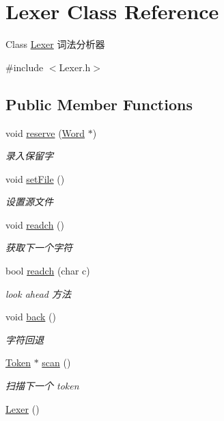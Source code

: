 \hypertarget{class_lexer}{}\section{Lexer Class Reference}
\label{class_lexer}


Class \hyperlink{class_lexer}{Lexer} 词法分析器  




{\ttfamily \#include $<$Lexer.\+h$>$}

\subsection*{Public Member Functions}
\begin{DoxyCompactItemize}
\item 
void \hyperlink{class_lexer_ae96c693bf6eba38f21adab5fc94c18b1}{reserve} (\hyperlink{class_word}{Word} $\ast$)
\begin{DoxyCompactList}\small\item\em 录入保留字 \end{DoxyCompactList}\item 
void \hyperlink{class_lexer_a9d7cdd99b7b18e3450cc365971bf76d2}{set\+File} ()
\begin{DoxyCompactList}\small\item\em 设置源文件 \end{DoxyCompactList}\item 
void \hyperlink{class_lexer_a5c91a26ad6b4294bf7bb8d4c46ea529b}{readch} ()
\begin{DoxyCompactList}\small\item\em 获取下一个字符 \end{DoxyCompactList}\item 
bool \hyperlink{class_lexer_acbe68a5d98ebc3b3a87fd27f000030a5}{readch} (char c)
\begin{DoxyCompactList}\small\item\em look ahead 方法 \end{DoxyCompactList}\item 
void \hyperlink{class_lexer_ae28380e5c67144a1aeaf37f33ab11fb2}{back} ()
\begin{DoxyCompactList}\small\item\em 字符回退 \end{DoxyCompactList}\item 
\hyperlink{class_token}{Token} $\ast$ \hyperlink{class_lexer_a2085b8262f6237de60583375ee2731f4}{scan} ()
\begin{DoxyCompactList}\small\item\em 扫描下一个 token \end{DoxyCompactList}\item 
\hyperlink{class_lexer_a2752a2b16cc1ffbcb8fc3e82e95bf331}{Lexer} ()
\end{DoxyCompactItemize}
